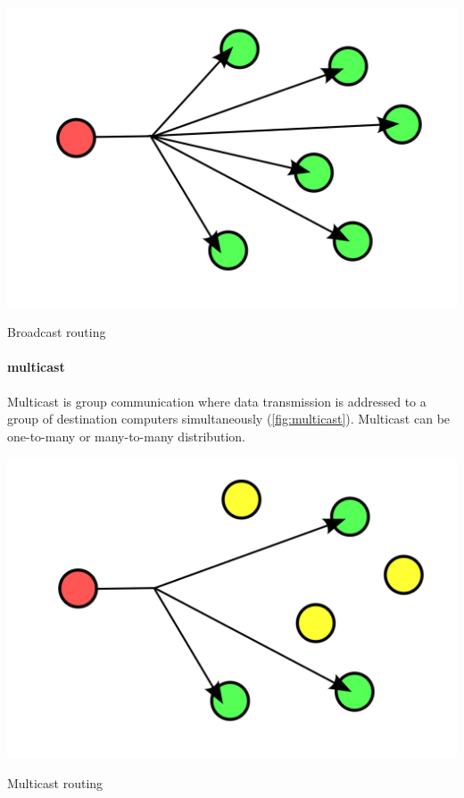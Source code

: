 \begin{marginfigure}
\includegraphics[width=\textwidth]{images/introduction/broadcast.png}
\caption[Broadcast routing scheme]{Broadcast routing}
\label{fig:broadcast}
\end{marginfigure}
   

\paragraph{multicast}
Multicast is group communication where data transmission is addressed to a group of destination computers simultaneously (\cref{fig:multicast}).
Multicast can be one-to-many or many-to-many distribution.

\begin{marginfigure}
\includegraphics[width=\textwidth]{images/introduction/multicast.png}
\caption[Multicast routing scheme]{Multicast routing}
\label{fig:multicast}
\end{marginfigure}


